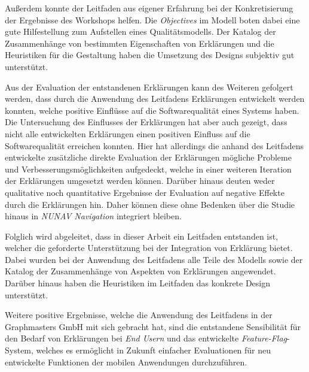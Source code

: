 Außerdem konnte der Leitfaden aus eigener Erfahrung bei der Konkretisierung der Ergebnisse des Workshops helfen. Die \textit{Objectives} im Modell boten dabei eine gute Hilfestellung zum Aufstellen eines Qualitätsmodells. Der Katalog der Zusammenhänge von bestimmten Eigenschaften von Erklärungen und die Heuristiken für die Gestaltung haben die Umsetzung des Designs subjektiv gut unterstützt.

Aus der Evaluation der entstandenen Erklärungen kann des Weiteren gefolgert werden, dass durch die Anwendung des Leitfadens Erklärungen entwickelt werden konnten, welche positive Einflüsse auf die Softwarequalität eines Systems haben. Die Untersuchung des Einflusses der Erklärungen hat aber auch gezeigt, dass nicht alle entwickelten Erklärungen einen positiven Einfluss auf die Softwarequalität erreichen konnten. Hier hat allerdings die anhand des Leitfadens entwickelte zusätzliche direkte Evaluation der Erklärungen mögliche Probleme und Verbesserungsmöglichkeiten aufgedeckt, welche in einer weiteren Iteration der Erklärungen umgesetzt werden können. Darüber hinaus deuten weder qualitative noch quantitative Ergebnisse der Evaluation auf negative Effekte durch die Erklärungen hin. Daher können diese ohne Bedenken über die Studie hinaus in \textit{NUNAV Navigation} integriert bleiben.

Folglich wird abgeleitet, dass in dieser Arbeit ein Leitfaden entstanden ist, welcher die geforderte Unterstützung bei der Integration von Erklärung bietet. Dabei wurden bei der Anwendung des Leitfadens alle Teile des Modells sowie der Katalog der Zusammenhänge von Aspekten von Erklärungen angewendet. Darüber hinaus haben die Heuristiken im Leitfaden das konkrete Design unterstützt.

Weitere positive Ergebnisse, welche die Anwendung des Leitfadens in der Graphmasters GmbH mit sich gebracht hat, sind die entstandene Sensibilität für den Bedarf von Erklärungen bei \textit{End Usern} und das entwickelte \textit{Feature-Flag}-System, welches es ermöglicht in Zukunft einfacher Evaluationen für neu entwickelte Funktionen der mobilen Anwendungen durchzuführen.
